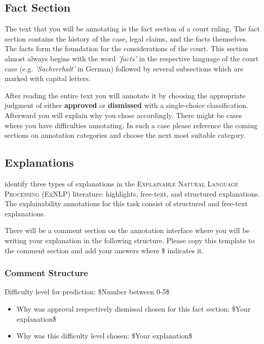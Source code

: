 \documentclass{article}
\begin{document}
\subsection{Fact Section}
The text that you will be annotating is the fact section of a court ruling. The fact section contains the history of the case, legal claims, and the facts themselves. The facts form the foundation for the considerations of the court. This section almost always begins with the word \emph{'facts'} in the respective language of the court case (e.g. \emph{'Sachverhalt'} in German) followed by several subsections which are marked with capital letters. 

After reading the entire text you will annotate it by choosing the appropriate judgment of either \textbf{approved} or \textbf{dismissed} with a single-choice classification. Afterward you will explain why you chose accordingly. There might be cases where you have difficulties annotating. In such a case please reference the coming sections on annotation categories and choose the next most suitable category.

\subsection{Explanations}
\cite{TMTE_2021} identify three types of explanations in the \textsc{Explainable Natural Language Processing} (ExNLP) literature: highlights, free-text, and structured explanations. The explainability annotations for this task consist of structured and free-text explanations. 

There will be a comment section on the annotation interface where you will be writing your explanation in the following structure. Please copy this template to the comment section and add your answers where \$ indicates it.

\subsubsection{Comment Structure}
\begin{mdframed}[frametitle={\$Annotators name\$}]
Difficulty level for prediction: \$Number between 0-5\$
\begin{itemize}
	\item Why was approval respectively dismissal chosen for this fact section: \$Your explanation\$
	\item Why was this difficulty level chosen: \$Your explanation\$
\end{itemize}	
\end{mdframed}
\end{document}
